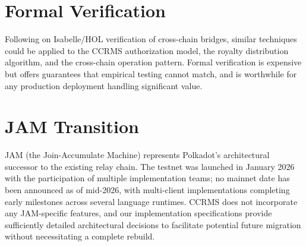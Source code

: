 \section{Formal Verification}\label{sec:e-formal-verification}

Following \citet{maricEtAl2025} on Isabelle/HOL verification of cross-chain bridges, similar techniques could be applied to the CCRMS authorization model, the royalty distribution algorithm, and the cross-chain operation pattern. Formal verification is expensive but offers guarantees that empirical testing cannot match, and is worthwhile for any production deployment handling significant value.

\section{JAM Transition}\label{sec:e-jam}

JAM (the Join-Accumulate Machine) represents Polkadot's architectural successor to the existing relay chain. The testnet was launched in January 2026 with the participation of multiple implementation teams; no mainnet date has been announced as of mid-2026, with multi-client implementations completing early milestones across several language runtimes. CCRMS does not incorporate any JAM-specific features, and our implementation specifications provide sufficiently detailed architectural decisions to facilitate potential future migration without necessitating a complete rebuild.
